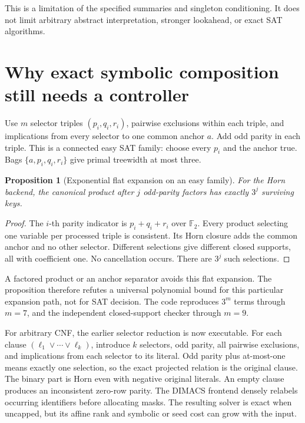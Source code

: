 \documentclass[11pt]{article}
\newtheorem{proposition}[theorem]{Proposition}
\newcommand{\F}{\mathbb F_2}
\begin{document}
This is a limitation of the specified summaries and singleton
conditioning. It does not limit arbitrary abstract interpretation,
stronger lookahead, or exact SAT algorithms.

\section{Why exact symbolic composition still needs a controller}
Use \(m\) selector triples \((p_i,q_i,r_i)\), pairwise exclusions within
each triple, and implications from every selector to one common anchor
\(a\). Add odd parity in each triple. This is a connected easy SAT family:
choose every \(p_i\) and the anchor true. Bags
\(\{a,p_i,q_i,r_i\}\) give primal treewidth at most three.

\begin{proposition}[Exponential flat expansion on an easy family]
For the Horn backend, the canonical product after \(j\) odd-parity
factors has exactly \(3^j\) surviving keys.
\end{proposition}
\begin{proof}
The \(i\)-th parity indicator is \(p_i+q_i+r_i\) over \(\F\).
Every product selecting one variable per processed triple is consistent.
Its Horn closure adds the common anchor and no other selector.
Different selections give different closed supports, all with coefficient
one. No cancellation occurs. There are \(3^j\) such selections.
\end{proof}

A factored product or an anchor separator avoids this flat expansion.
The proposition therefore refutes a universal polynomial bound for this
particular expansion path, not for SAT decision.
The code reproduces \(3^m\) terms through \(m=7\), and the independent
closed-support checker through \(m=9\).

For arbitrary CNF, the earlier selector reduction is now executable.
For each clause \((\ell_1\vee\cdots\vee\ell_k)\), introduce \(k\) selectors,
odd parity, all pairwise exclusions, and implications from each selector
to its literal. Odd parity plus at-most-one means exactly one selection,
so the exact projected relation is the original clause.
The binary part is Horn even with negative original literals.
An empty clause produces an inconsistent zero-row parity.
The DIMACS frontend densely relabels occurring identifiers before
allocating masks. The resulting solver is exact when uncapped, but its
affine rank and symbolic or seed cost can grow with the input.
\end{document}
